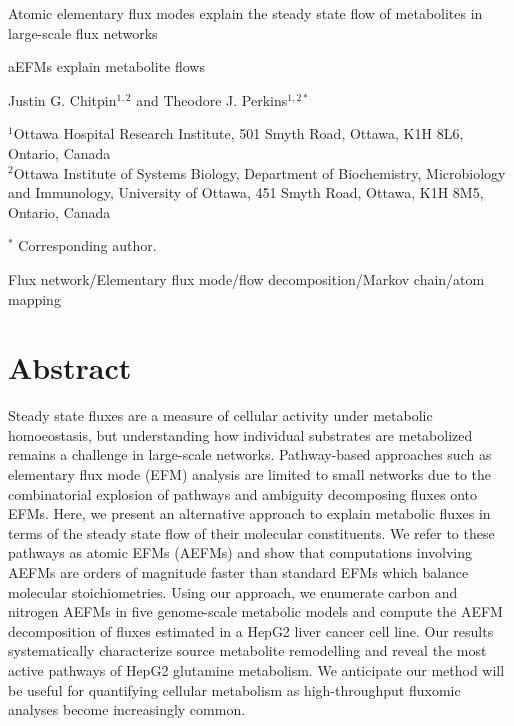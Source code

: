 \documentclass[12pt]{article}
\begin{document}
\begin{titlepage}
    \begin{center}
        \vspace*{1cm}

        Atomic elementary flux modes explain the steady state flow of
        metabolites in large-scale flux networks

        \vspace{1.0cm}
        aEFMs explain metabolite flows
            
        \vspace{1.0cm}

        Justin G. Chitpin$^{1,2}$ and Theodore J. Perkins$^{1,2*}$

        \vspace{1.0cm}

        $^1$Ottawa Hospital Research Institute, 501 Smyth Road, Ottawa, K1H 8L6, Ontario, Canada\\
        $^2$Ottawa Institute of Systems Biology, Department of Biochemistry, Microbiology and Immunology, University of Ottawa, 451 Smyth Road, Ottawa, K1H 8M5, Ontario, Canada
           
        \vspace{0.5cm}

        $^*$ Corresponding author.

        \vspace{1.0cm}
     
        Flux network/Elementary flux mode/flow decomposition/Markov chain/atom mapping
            
   \end{center}
\end{titlepage}

\clearpage

\section*{Abstract} %

Steady state fluxes are a measure of cellular activity under metabolic
homoeostasis, but understanding how individual substrates are metabolized
remains a challenge in large-scale networks. Pathway-based approaches such
as elementary flux mode (EFM) analysis are limited to small networks due
to the combinatorial explosion of pathways and ambiguity decomposing
fluxes onto EFMs. Here, we present an alternative approach to explain
metabolic fluxes in terms of the steady state flow of their molecular
constituents. We refer to these pathways as atomic EFMs (AEFMs) and show
that computations involving AEFMs are orders of magnitude faster than
standard EFMs which balance molecular stoichiometries. Using our approach,
we enumerate carbon and nitrogen AEFMs in five genome-scale metabolic
models and compute the AEFM decomposition of fluxes estimated in a HepG2
liver cancer cell line. Our results systematically characterize source
metabolite remodelling and reveal the most active pathways of HepG2
glutamine metabolism. We anticipate our method will be useful for
quantifying cellular metabolism as high-throughput fluxomic analyses
become increasingly common.
\end{document}
